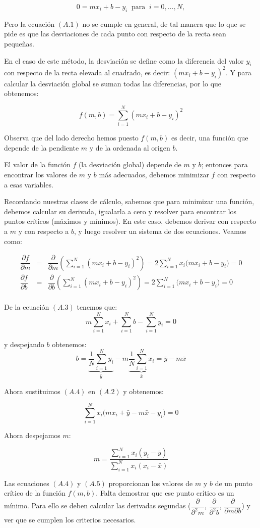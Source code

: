 \documentclass[
  letterpaper,
  DIV=11,
  numbers=noendperiod]{scrreprt}
\begin{document}
\[0 = m x_i + b - y_i\;\; \text{para} \;\; i = 0, \dots, N, \tag{A.1} \]

Pero la ecuación \((A.1)\) no se cumple en general, de tal manera que lo
que se pide es que las desviaciones de cada punto con respecto de la
recta sean pequeñas.

En el caso de este método, la desviación se define como la diferencia
del valor \(y_i\) con respecto de la recta elevada al cuadrado, es
decir: \((m x_i + b - y_i)^2\). Y para calcular la desviación global se
suman todas las diferencias, por lo que obtenemos:

\[
f(m,b) = \sum_{i=1}^{N} (m x_i + b - y_i)^2
\]

Observa que del lado derecho hemos puesto \(f(m,b)\) es decir, una
función que depende de la pendiente \(m\) y de la ordenada al origen
\(b\).

El valor de la función \(f\) (la desviación global) depende de \(m\) y
\(b\); entonces para encontrar los valores de \(m\) y \(b\) más
adecuados, debemos minimizar \(f\) con respecto a esas variables.

Recordando nuestras clases de cálculo, sabemos que para minimizar una
función, debemos calcular su derivada, igualarla a cero y resolver para
encontrar los puntos críticos (máximos y mínimos). En este caso, debemos
derivar con respecto a \(m\) y con respecto a \(b\), y luego resolver un
sistema de dos ecuaciones. Veamos como:

\[
\begin{eqnarray}
\dfrac{\partial f}{\partial m} & = & \dfrac{\partial}{\partial m} \left(\sum_{i=1}^{N} (m x_i + b - y_i)^2 \right) = 2 \sum_{i=1}^{N} x_i \big(m x_i + b - y_i\big) = 0 \tag{A.2}\\
\dfrac{\partial f}{\partial b} & = & \dfrac{\partial}{\partial b} \left(\sum_{i=1}^{N} (m x_i + b - y_i)^2 \right) = 2\sum_{i=1}^{N} \big(m x_i + b - y_i\big) = 0 \tag{A.3}\\
\end{eqnarray}
\]

De la ecuación \((A.3)\) tenemos que: \[
m \sum_{i=1}^{N} x_i + \sum_{i=1}^{N} b - \sum_{i=1}^{N} y_i = 0
\]

y despejando \(b\) obtenemos: \[
b = \underbrace{\dfrac{1}{N}\sum_{i=1}^{N} y_i}_{\bar{y}} - m \underbrace{\dfrac{1}{N} \sum_{i=1}^{N} x_i}_{\bar{x}} = \bar{y} - m \bar{x} \tag{A.4}
\]

Ahora sustituimos \((A.4)\) en \((A.2)\) y obtenemos:

\[
\sum_{i=1}^{N} x_i \big(m x_i + \bar{y} - m \bar{x} - y_i\big) = 0
\]

Ahora despejamos \(m\):

\[
m = \dfrac{\sum_{i=1}^{N} x_i(y_i - \bar{y})}{\sum_{i=1}^{N} x_i(x_i - \bar{x})} \tag{A.5}
\]

Las ecuaciones \((A.4)\) y \((A.5)\) proporcionan los valores de \(m\) y
\(b\) de un punto crítico de la función \(f(m,b)\). Falta demostrar que
ese punto crítico es un mínimo. Para ello se deben calcular las
derivadas segundas (\(\dfrac{\partial}{\partial^2 m}\),
\(\dfrac{\partial}{\partial^2 b}\),
\(\dfrac{\partial}{\partial m \partial b}\)) y ver que se cumplen los
criterios necesarios.
\end{document}
